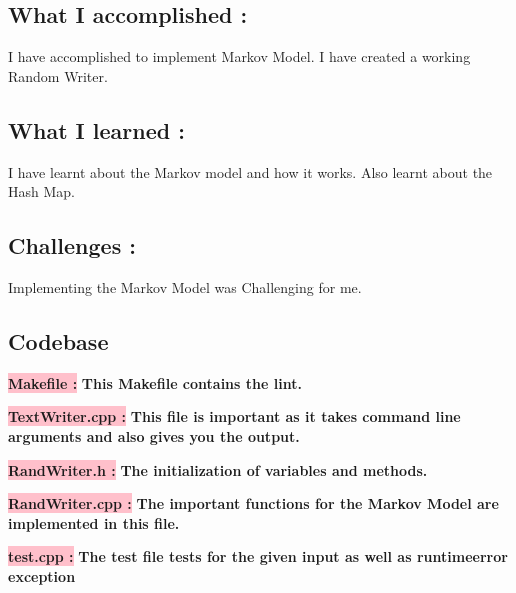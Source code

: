 \subsection{What I accomplished :}

I have accomplished to implement Markov Model. I have created a working Random Writer.

\subsection{What I learned :}

I have learnt about the Markov model and how it works. Also learnt about the Hash Map.

\subsection{Challenges :}

Implementing the Markov Model was Challenging for me.

\subsection{Codebase}\label{sec:ps6:code}

\textbf{\colorbox{pink}{Makefile :}} \newline \textbf{This Makefile contains the lint.}


\textbf{\colorbox{pink}{TextWriter.cpp :}} \newline \textbf{This file is important as it takes command line arguments and also gives you the output.}


\textbf{\colorbox{pink}{RandWriter.h :}} \newline \textbf{The initialization of variables and methods.}

\newpage

\textbf{\colorbox{pink}{RandWriter.cpp :}} \newline \textbf{The important functions for the Markov Model are implemented in this file.}





\textbf{\colorbox{pink}{test.cpp :}} \newline \textbf{The test file tests for the given input as well as runtimeerror exception}



\newpage
